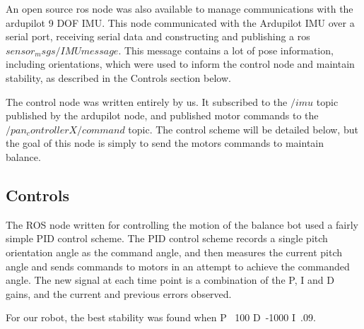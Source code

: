 \documentclass[12pt,conference,onecolumn,titlepage]{IEEEtran} %
\begin{document}
An open source ros node was also available to manage communications with the ardupilot 9 DOF IMU. This node communicated with the Ardupilot IMU over a serial port, receiving serial data and constructing and publishing a ros $sensor_msgs/IMU message$. This message contains a lot of pose information, including orientations, which were used to inform the control node and maintain stability, as described in the Controls section below.

The control node was written entirely by us. It subscribed to the $/imu$ topic published by the ardupilot node, and published motor commands to the $/pan_controllerX/command$ topic. The control scheme will be detailed below, but the goal of this node is simply to send the motors commands to maintain balance.


\subsection{Controls} %
\label{sec:controls}
The ROS node written for controlling the motion of the balance bot used a fairly simple PID control scheme. The PID control scheme records a single pitch orientation angle as the command angle, and then measures the current pitch angle and sends commands to motors in an attempt to achieve the commanded angle. The new signal at each time point is a combination of the P, I and D gains, and the current and previous errors observed.

For our robot, the best stability was found when P ~100 D~-1000 I~.09.

\end{document}

